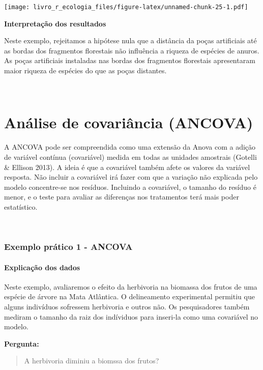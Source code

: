 \documentclass[
]{book}
\begin{document}
\texttt{[image: livro\_r\_ecologia\_files/figure-latex/unnamed-chunk-25-1.pdf]}

\textbf{Interpretação dos resultados}

Neste exemplo, rejeitamos a hipótese nula que a distância da poças artificiais até as bordas dos fragmentos florestais não influência a riqueza de espécies de anuros. As poças artificiais instaladas nas bordas dos fragmentos florestais apresentaram maior riqueza de espécies do que as poças distantes.

~

\hypertarget{anuxe1lise-de-covariuxe2ncia-ancova}{%
\section{Análise de covariância (ANCOVA)}\label{anuxe1lise-de-covariuxe2ncia-ancova}}

A ANCOVA pode ser compreendida como uma extensão da Anova com a adição de variável contínua (covariável) medida em todas as unidades amostrais (Gotelli \& Ellison 2013). A ideia é que a covariável também afete os valores da variável resposta. Não incluir a covariável irá fazer com que a variação não explicada pelo modelo concentre-se nos resíduos. Incluindo a covariável, o tamanho do resíduo é menor, e o teste para avaliar as diferenças nos tratamentos terá mais poder estatístico.

~

\hypertarget{exemplo-pruxe1tico-1---ancova}{%
\subsubsection{Exemplo prático 1 - ANCOVA}\label{exemplo-pruxe1tico-1---ancova}}

\hypertarget{explicauxe7uxe3o-dos-dados-11}{%
\paragraph{Explicação dos dados}\label{explicauxe7uxe3o-dos-dados-11}}

Neste exemplo, avaliaremos o efeito da herbivoria na biomassa dos frutos de uma espécie de árvore na Mata Atlântica. O delineamento experimental permitiu que alguns indivíduos sofressem herbivoria e outros não. Os pesquisadores também mediram o tamanho da raiz dos indíviduos para inseri-la como uma covariável no modelo.

\textbf{Pergunta:}

\begin{quote}
A herbivoria diminiu a biomssa dos frutos?
\end{quote}
\end{document}
